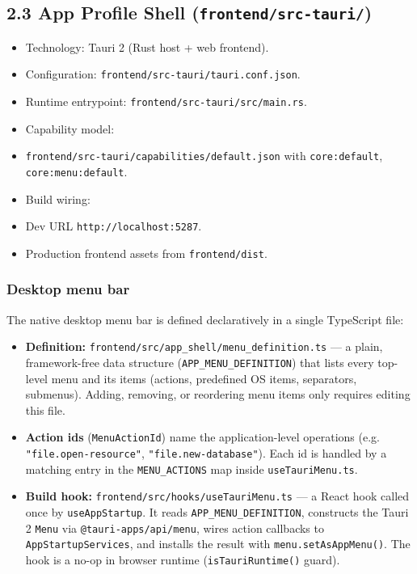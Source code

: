 \documentclass[]{article}
\providecommand{\tightlist}{%
  \setlength{\itemsep}{0pt}\setlength{\parskip}{0pt}}
\begin{document}
\subsection{\texorpdfstring{2.3 App Profile Shell
(\texttt{frontend/src-tauri/})}{2.3 App Profile Shell (frontend/src-tauri/)}}\label{app-profile-shell-frontendsrc-tauri}

\begin{itemize}
\tightlist
\item
  Technology: Tauri 2 (Rust host + web frontend).
\item
  Configuration: \texttt{frontend/src-tauri/tauri.conf.json}.
\item
  Runtime entrypoint: \texttt{frontend/src-tauri/src/main.rs}.
\item
  Capability model:
\item
  \texttt{frontend/src-tauri/capabilities/default.json} with
  \texttt{core:default}, \texttt{core:menu:default}.
\item
  Build wiring:
\item
  Dev URL \texttt{http://localhost:5287}.
\item
  Production frontend assets from \texttt{frontend/dist}.
\end{itemize}

\subsubsection{Desktop menu bar}\label{desktop-menu-bar}

The native desktop menu bar is defined declaratively in a single
TypeScript file:

\begin{itemize}
\item
  \textbf{Definition:}
  \texttt{frontend/src/app\_shell/menu\_definition.ts} --- a plain,
  framework-free data structure (\texttt{APP\_MENU\_DEFINITION}) that
  lists every top-level menu and its items (actions, predefined OS
  items, separators, submenus). Adding, removing, or reordering menu
  items only requires editing this file.
\item
  \textbf{Action ids} (\texttt{MenuActionId}) name the application-level
  operations (e.g. \texttt{"file.open-resource"},
  \texttt{"file.new-database"}). Each id is handled by a matching entry
  in the \texttt{MENU\_ACTIONS} map inside \texttt{useTauriMenu.ts}.
\item
  \textbf{Build hook:} \texttt{frontend/src/hooks/useTauriMenu.ts} --- a
  React hook called once by \texttt{useAppStartup}. It reads
  \texttt{APP\_MENU\_DEFINITION}, constructs the Tauri 2 \texttt{Menu}
  via \texttt{@tauri-apps/api/menu}, wires action callbacks to
  \texttt{AppStartupServices}, and installs the result with
  \texttt{menu.setAsAppMenu()}. The hook is a no-op in browser runtime
  (\texttt{isTauriRuntime()} guard).
\end{itemize}
\end{document}
